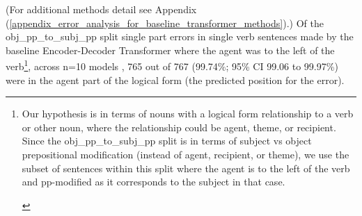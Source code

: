\documentclass[11pt]{article}
\begin{document}


(For additional methods detail see Appendix (\ref{appendix_error_analysis_for_baseline_transformer_methods}).) Of the obj\_pp\_to\_subj\_pp split single part errors in single verb sentences made by the \cite{Wu2023} baseline Encoder-Decoder Transformer where the agent was to the left of the verb\footnote{\begin{footnotesize}Our hypothesis is in terms of nouns with a logical form relationship to a verb or other noun, where the relationship could be agent, theme, or recipient.
Since the obj\_pp\_to\_subj\_pp split is in terms of subject vs object prepositional modification (instead of agent, recipient, or theme), we use the subset of sentences within this split where the agent is to the left of the verb and pp-modified as it corresponds to the subject in that case.
\end{footnotesize}
}, 
across n=10 models
, 765 out of 767 (99.74\%; 95\% CI 99.06 to 99.97\%) were in the agent part of the logical form (the predicted position for the error).
\end{document}
